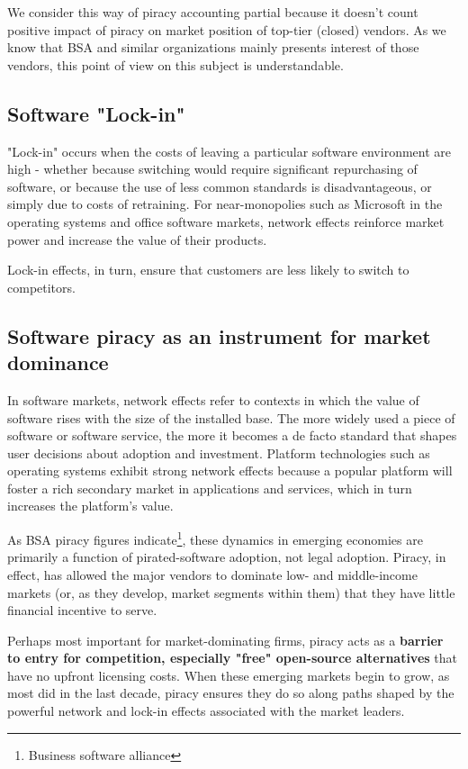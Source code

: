 \documentclass[times, utf8, seminar]{fit}
\begin{document}
We consider this way of piracy accounting partial because it doesn't count positive impact of piracy on market position of top-tier (closed) vendors. As we know that BSA and similar organizations mainly presents interest of those vendors, this point of view on this subject is understandable.  

\subsection{Software "Lock-in"}

"Lock-in" occurs when the costs of leaving a particular software environment are high - whether because switching would require significant repurchasing of software, or because the use of less common standards is disadvantageous, or simply due to costs of retraining. For near-monopolies such as Microsoft in the operating systems and office software markets, network effects reinforce market power and increase the value of their products.

Lock-in effects, in turn, ensure that customers are less likely to switch to competitors.

\subsection{Software piracy as an instrument for market dominance}  

In software markets, network effects refer to contexts in which the value of software rises with the size of the installed base. The more widely used a piece of software or software service, the more it becomes a de facto standard that shapes user decisions about adoption and investment. Platform technologies such as operating systems exhibit strong network effects because a popular platform will foster a rich secondary market in applications and services, which in turn increases the platform’s value. 

As BSA piracy figures indicate\footnote{Business software alliance}, these dynamics in emerging economies are primarily a function of pirated-software adoption, not legal adoption. Piracy, in effect, has allowed the major vendors to dominate low- and middle-income markets (or, as they develop, market segments within them) that they have little financial incentive to serve. 

Perhaps most important for market-dominating firms, piracy acts as a \textbf{barrier to entry for competition, especially "free" open-source alternatives} that have no upfront licensing costs. When these emerging markets begin to grow, as most did in the last decade, piracy ensures they do so along paths shaped by the powerful network and lock-in effects associated with the market leaders.
\end{document}
